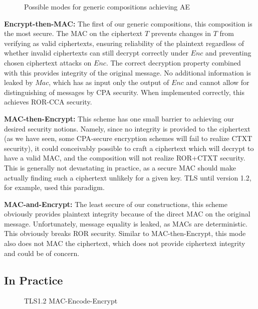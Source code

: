 \begin{figure}
\hspace{-10mm}\scalebox{0.6}{}
  \caption{Possible modes for generic compositions achieving AE}
\label{fig:cpamac}
\end{figure}

\textbf{Encrypt-then-MAC:} The first of our generic compositions, this composition is the most secure.  The MAC on the ciphertext $T$ prevents changes 
in $T$ from verifying as valid ciphertexts, ensuring reliability of the plaintext regardless of whether invalid ciphertexts can still decrypt 
correctly under $Enc$ and preventing chosen ciphertext attacks on $Enc$.  The correct decryption property combined with this provides integrity of the 
original message.  No additional information is leaked by $Mac$, which has as input only the output of $Enc$ and cannot allow for distinguishing of 
messages by CPA security.  When implemented correctly, this achieves ROR-CCA security.

\textbf{MAC-then-Encrypt:} This scheme has one small barrier to achieving our desired security notions.  Namely, since no integrity is provided to the 
ciphertext (as we have seen, some CPA-secure encryption schemes will fail to realize CTXT security), it could conceivably possible to craft a 
ciphertext which will decrypt to have a valid MAC, and the composition will not realize ROR+CTXT security.  This is generally not devastating in 
practice, as a secure MAC should make actually finding such a ciphertext unlikely for a given key.  TLS until version 1.2, for example, used this 
paradigm.

\textbf{MAC-and-Encrypt:} The least secure of our constructions, this scheme obviously provides plaintext integrity because of the direct MAC on the 
original message.  Unfortunately, message equality is leaked, as MACs are deterministic.  This obviously breaks ROR security.  Similar to 
MAC-then-Encrypt, this mode also does not MAC the ciphertext, which does not provide ciphertext integrity and could be of concern.


\subsection{In Practice}


\begin{figure}[h]
\centering
\scalebox{0.6}{}
  \caption{TLS1.2 MAC-Encode-Encrypt}
\label{fig:tls12mee}
\end{figure}

